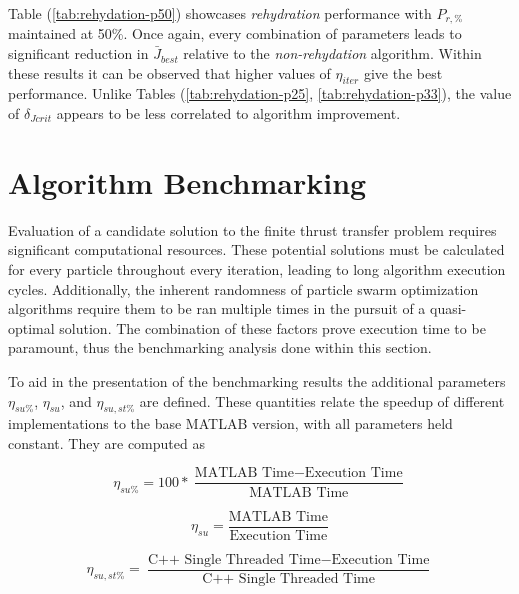 \noindent Table (\ref{tab:rehydation-p50}) showcases \textit{rehydration} performance with 
$P_{r,\text{\%}}$ maintained at 50\%. Once again, every combination of parameters leads to 
significant reduction in $\bar{J}_{best}$ relative to the \textit{non-rehydation} algorithm. 
Within these results it can be observed that higher values of
$\eta_{iter}$ give the best performance. Unlike Tables (\ref{tab:rehydation-p25}, \ref{tab:rehydation-p33}), 
the value of $\delta_{Jcrit}$ appears to be less correlated to algorithm improvement.

\section{Algorithm Benchmarking}

\noindent Evaluation of a candidate solution to the finite thrust transfer problem requires significant computational resources.
These potential solutions must be calculated for every particle throughout every iteration, leading to long algorithm execution cycles.
Additionally, the inherent randomness of particle swarm optimization algorithms require them to be ran multiple times in the
pursuit of a quasi-optimal solution. The combination of these factors prove execution time to be paramount, thus the benchmarking
analysis done within this section. \newline

\noindent To aid in the presentation of the benchmarking results the additional parameters $\eta_{su\%}$, $\eta_{su}$, and $\eta_{su,st\%}$ are defined. 
These quantities relate the speedup of different implementations to the base MATLAB version, with all parameters held constant. 
They are computed as

\begin{equation}
\eta_{su\%} = 100*\frac{\text{MATLAB Time} - \text{Execution Time}}{\text{MATLAB Time}}
\label{eq:etaSUpercent}
\end{equation}


\begin{equation}
  \eta_{su} = \frac{\text{MATLAB Time}}{\text{Execution Time}}
  \label{eq:etaSU}
  \end{equation}


\begin{equation}
  \eta_{su,st\%} = \frac{\text{C++ Single Threaded Time} - \text{Execution Time}}{\text{C++ Single Threaded Time}}
  \label{eq:etaSUSTpercent}
  \end{equation}

